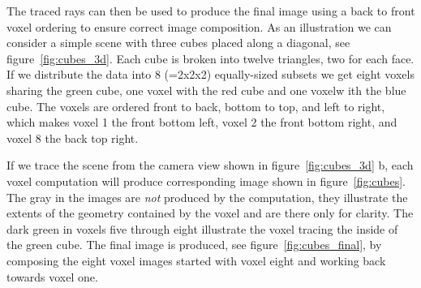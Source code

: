 The traced rays can then be used to produce the final image using a back to 
front voxel ordering to ensure correct image composition.  As an illustration we 
can consider a simple scene with three cubes placed along a diagonal, 
see figure~\ref{fig:cubes_3d}.  Each cube is broken into twelve triangles, two 
for each face.  If we distribute the data into 8 (=2x2x2) equally-sized subsets
we get eight voxels sharing the green cube, one voxel with the red cube and one 
voxelw ith the blue cube.  The voxels are ordered front to back, bottom to top, 
and left to right, which makes voxel 1 the front bottom left, voxel 2 the front 
bottom right, and voxel 8 the back top right. 

If we trace the scene from the camera view shown in figure~\ref{fig:cubes_3d} b, 
each voxel computation will produce corresponding image shown in 
figure~\ref{fig:cubes}.  The gray in the images are \emph{not} produced by the
computation, they illustrate the extents of the geometry contained by the voxel 
and are there only for clarity.  The dark green in voxels five through eight 
illustrate the voxel tracing the inside of the green cube.  The final image is 
produced, see figure~\ref{fig:cubes_final}, by composing the eight voxel images
started with voxel eight and working back towards voxel one.  

